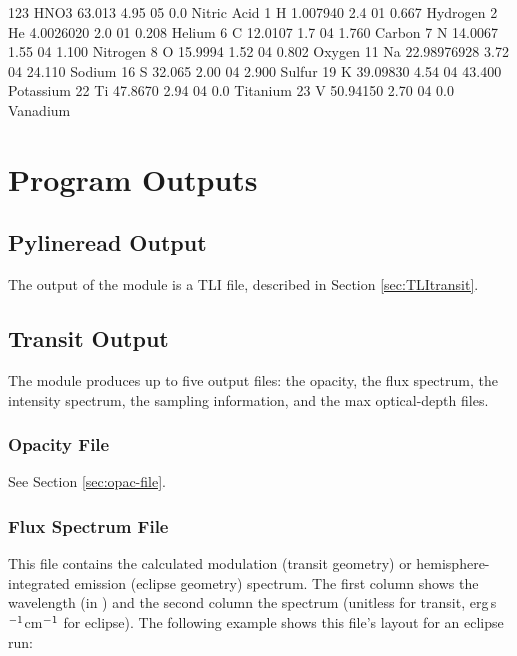\documentclass[letterpaper, 12pt]{article}
\begin{document}
\begin{plain}
 123    HNO3      63.013       4.95      05         0.0           Nitric Acid
   1    H          1.007940    2.4       01         0.667         Hydrogen
   2    He         4.0026020   2.0       01         0.208         Helium
   6    C         12.0107      1.7       04         1.760         Carbon
   7    N         14.0067      1.55      04         1.100         Nitrogen
   8    O         15.9994      1.52      04         0.802         Oxygen
  11    Na        22.98976928  3.72      04        24.110         Sodium
  16    S         32.065       2.00      04         2.900         Sulfur
  19    K         39.09830     4.54      04        43.400         Potassium
  22    Ti        47.8670      2.94      04         0.0           Titanium
  23    V         50.94150     2.70      04         0.0           Vanadium
\end{plain}


\section{Program Outputs}
\label{sec:outputs}

\subsection{Pylineread Output}
\label{sec:pyline-out}

The output of the {\pylineread} module is a TLI file, described in
Section \ref{sec:TLItransit}.

\subsection{Transit Output}
\label{sec:tran-out}

The {\transit} module produces up to five output files: the opacity,
the flux spectrum, the intensity spectrum, the sampling information,
and the max optical-depth files.

\subsubsection{Opacity File}
See Section \ref{sec:opac-file}.

\subsubsection{Flux Spectrum File}

This file contains the calculated modulation (transit geometry) or
hemisphere-integrated emission (eclipse geometry) spectrum.  The first
column shows the wavelength (in {\microns}) and the second column the
spectrum (unitless for transit, erg\,s$\sp{-1}$cm$\sp{-1}$ for
eclipse).  The following example shows this file's layout for an
eclipse run:
\end{document}
